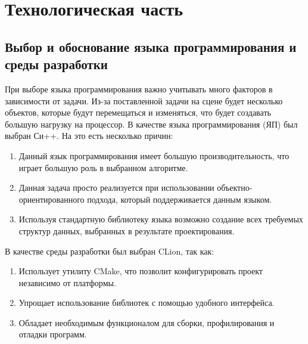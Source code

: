 \chapter{Технологическая часть}
\section{Выбор и обоснование языка программирования и среды разработки}
При выборе языка программирования важно учитывать много факторов в 
зависимости от задачи. Из-за поставленной задачи на сцене будет несколько объектов, которые будут
перемещаться и изменяться, что будет создавать большую нагрузку на процессор.
В качестве языка программирования (ЯП) был выбран Си++. На это есть 
несколько причин:
\begin{enumerate}
    \item Данный язык программирования имеет большую производительность, что играет большую роль в выбранном алгоритме.
    \item Данная задача просто реализуется при использовании объектно-ориентированного подхода, который поддерживается данным языком.
    \item Используя стандартную библиотеку языка возможно создание всех требуемых структур данных, выбранных в результате проектирования.
\end{enumerate}
В качестве среды разработки был выбран CLion, так как:
\begin{enumerate}
    \item Использует утилиту CMake, что позволит конфигурировать проект независимо от платформы.
    \item Упрощает использование библиотек с помощью удобного интерфейса.
    \item Обладает необходимым функционалом для сборки, профилирования и отладки программ.
\end{enumerate}

